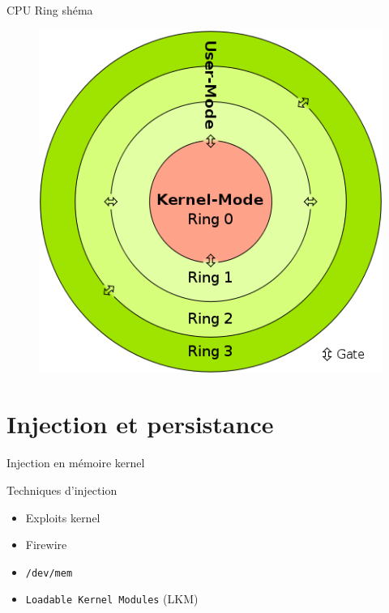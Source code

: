 \documentclass[10pt]{beamer}
\begin{document}
		\begin{frame}{CPU Ring shéma}

    		\begin{figure}
				\begin{center}
					\includegraphics[scale=0.4]{ring.png}
				\end{center}
  		  	\end{figure}	
			
		\end{frame}		

\section{Injection et persistance}

	\begin{frame}{Injection en mémoire kernel}
		\begin{alertblock}{Techniques d'injection}
	    \end{alertblock}
		\vspace{-0.60cm}
		\begin{itemize}
			\item Exploits kernel
			\item Firewire
			\item\texttt{/dev/mem}
			\item \texttt{Loadable Kernel Modules} (LKM)
		\end{itemize}
	\end{frame}
\end{document}
